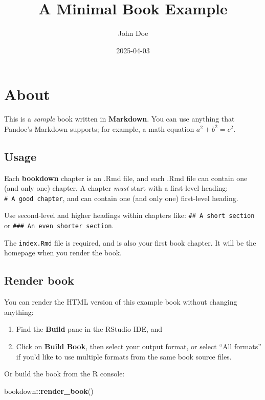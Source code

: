 \documentclass[
]{book}
\title{A Minimal Book Example}
\author{John Doe}
\date{2025-04-03}
\newenvironment{Shaded}{\begin{snugshade}}{\end{snugshade}}
\newcommand{\FunctionTok}[1]{\textcolor[rgb]{0.13,0.29,0.53}{\textbf{#1}}}
\newcommand{\NormalTok}[1]{#1}
\newcommand{\SpecialCharTok}[1]{\textcolor[rgb]{0.81,0.36,0.00}{\textbf{#1}}}
\begin{document}
\maketitle

{
\setcounter{tocdepth}{1}
\tableofcontents
}
\chapter{About}\label{about}

This is a \emph{sample} book written in \textbf{Markdown}. You can use anything that Pandoc's Markdown supports; for example, a math equation \(a^2 + b^2 = c^2\).

\section{Usage}\label{usage}

Each \textbf{bookdown} chapter is an .Rmd file, and each .Rmd file can contain one (and only one) chapter. A chapter \emph{must} start with a first-level heading: \texttt{\#\ A\ good\ chapter}, and can contain one (and only one) first-level heading.

Use second-level and higher headings within chapters like: \texttt{\#\#\ A\ short\ section} or \texttt{\#\#\#\ An\ even\ shorter\ section}.

The \texttt{index.Rmd} file is required, and is also your first book chapter. It will be the homepage when you render the book.

\section{Render book}\label{render-book}

You can render the HTML version of this example book without changing anything:

\begin{enumerate}
\def\labelenumi{\arabic{enumi}.}
\item
  Find the \textbf{Build} pane in the RStudio IDE, and
\item
  Click on \textbf{Build Book}, then select your output format, or select ``All formats'' if you'd like to use multiple formats from the same book source files.
\end{enumerate}

Or build the book from the R console:

\begin{Shaded}
\begin{Highlighting}[]
\NormalTok{bookdown}\SpecialCharTok{::}\FunctionTok{render\_book}\NormalTok{()}
\end{Highlighting}
\end{Shaded}
\end{document}
